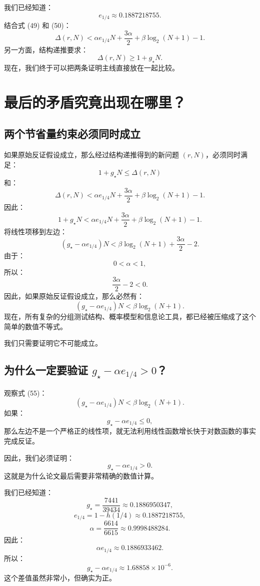 \documentclass[UTF8,11pt]{ctexart}
\begin{document}
我们已经知道：
\[e_{1/4}\approx0.1887218755.\]
结合式 (49) 和 (50)：
\begin{equation}
\boxed{\Delta(r,N)<\alpha e_{1/4}N+\frac{3\alpha}{2}+\beta\log_2(N+1)-1.}
\tag{52}
\end{equation}
另一方面，结构递推要求：
\begin{equation}\boxed{\Delta(r,N)\ge1+g_\star N.}\tag{53}\end{equation}
现在，我们终于可以把两条证明主线直接放在一起比较。

\section{最后的矛盾究竟出现在哪里？}
\subsection{两个节省量约束必须同时成立}
如果原始反证假设成立，那么经过结构递推得到的新问题 $(r,N)$，必须同时满足：
\[1+g_\star N\le\Delta(r,N)\]
和：
\[\Delta(r,N)<\alpha e_{1/4}N+\frac{3\alpha}{2}+\beta\log_2(N+1)-1.\]
因此：
\[1+g_\star N<\alpha e_{1/4}N+\frac{3\alpha}{2}+\beta\log_2(N+1)-1.\]
将线性项移到左边：
\begin{equation}\boxed{(g_\star-\alpha e_{1/4})N<\beta\log_2(N+1)+\frac{3\alpha}{2}-2.}\tag{54}\end{equation}
由于：
\[0<\alpha<1,\]
所以：
\[\frac{3\alpha}{2}-2<0.\]
因此，如果原始反证假设成立，那么必然有：
\begin{equation}\boxed{(g_\star-\alpha e_{1/4})N<\beta\log_2(N+1).}\tag{55}\end{equation}
现在，所有复杂的分组测试结构、概率模型和信息论工具，都已经被压缩成了这个简单的数值不等式。

我们只需要证明它不可能成立。

\subsection{为什么一定要验证 $g_\star-\alpha e_{1/4}>0$？}
观察式 (55)：
\[(g_\star-\alpha e_{1/4})N<\beta\log_2(N+1).\]
如果：
\[g_\star-\alpha e_{1/4}\le0,\]
那么左边不是一个严格正的线性项，就无法利用线性函数增长快于对数函数的事实完成反证。

因此，我们必须证明：
\[\boxed{g_\star-\alpha e_{1/4}>0.}\]
这就是为什么论文最后需要非常精确的数值计算。

我们已经知道：
\[g_\star=\frac{7441}{39434}\approx0.1886950347,\]
\[e_{1/4}=1-h(1/4)\approx0.1887218755,\]
\[\alpha=\frac{6614}{6615}\approx0.9998488284.\]
因此：
\[\alpha e_{1/4}\approx0.1886933462.\]
所以：
\[g_\star-\alpha e_{1/4}\approx1.68858\times10^{-6}.\]
这个差值虽然非常小，但确实为正。
\end{document}
